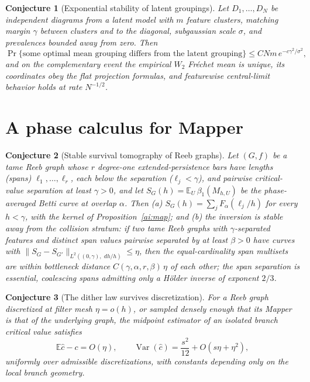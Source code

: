 \documentclass[11pt]{article}
\newtheorem{conjecture}{Conjecture}
\theoremstyle{definition}
\newcommand{\E}{\mathbb E}
\newcommand{\dd}{\,d}
\providecommand{\E}{\mathbb E}
\begin{document}
\begin{conjecture}[Exponential stability of latent groupings]\label{ai5}
Let $D_1,\ldots,D_N$ be independent diagrams from a latent model with $m$ feature clusters, matching margin $\gamma$ between clusters and to the diagonal, subgaussian scale $\sigma$, and prevalences bounded away from zero.  Then
\[
\Pr\{\text{some optimal mean grouping differs from the latent grouping}\}\le CNm\,e^{-c\gamma^2/\sigma^2},
\]
and on the complementary event the empirical $W_2$ Fr\'echet mean is unique, its coordinates obey the flat projection formulas, and featurewise central-limit behavior holds at rate $N^{-1/2}$.
\end{conjecture}

\section{A phase calculus for Mapper}

\begin{conjecture}[Stable survival tomography of Reeb graphs]\label{ai6}
Let $(G,f)$ be a tame Reeb graph whose $r$ degree-one extended-persistence bars have lengths (spans) $\ell_1,\ldots,\ell_r$, each below the separation ($\ell_j<\gamma$), and pairwise critical-value separation at least $\gamma>0$, and let $S_G(h)=\E_U\,\beta_1(M_{h,U})$ be the phase-averaged Betti curve at overlap $\alpha$.  Then (a) $S_G(h)=\sum_jF_\alpha(\ell_j/h)$ for every $h<\gamma$, with the kernel of Proposition~\ref{ai:map}; and (b) the inversion is stable away from the collision stratum: if two tame Reeb graphs with $\gamma$-separated features and distinct span values pairwise separated by at least $\beta>0$ have curves with $\lVert S_G-S_{G'}\rVert_{L^2((0,\gamma),\,\dd h/h)}\le\eta$, then the equal-cardinality span multisets are within bottleneck distance $C(\gamma,\alpha,r,\beta)\,\eta$ of each other; the span separation is essential, coalescing spans admitting only a H\"older inverse of exponent $2/3$.
\end{conjecture}

\begin{conjecture}[The dither law survives discretization]\label{ai7}
For a Reeb graph discretized at filter mesh $\eta=o(h)$, or sampled densely enough that its Mapper is that of the underlying graph, the midpoint estimator of an isolated branch critical value satisfies
\[
\E\widehat c-c=O(\eta),\qquad
\operatorname{Var}(\widehat c)=\frac{s^2}{12}+O(s\eta+\eta^2),
\]
uniformly over admissible discretizations, with constants depending only on the local branch geometry.
\end{conjecture}
\end{document}
